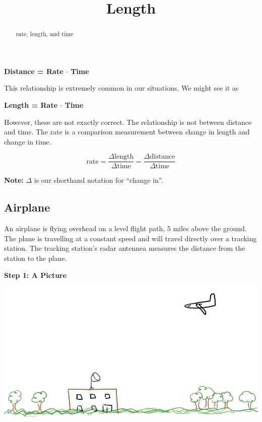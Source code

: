 \documentclass{ximera}
\title{Length}
\begin{document}
\begin{abstract}
rate, length, and time
\end{abstract}
\maketitle




\begin{center}
\textbf{\textcolor{purple!85!blue}{Distance = Rate $\cdot$ Time}} 
\end{center}

This relationship is extremely common in our situations.  We might see it as



\begin{center}
\textbf{\textcolor{purple!85!blue}{Length = Rate $\cdot$ Time}} 
\end{center}



However, these are not exactly correct.  The relationship is not between distance and time.  The rate is a comparison measurement between \textcolor{red!80!black}{change in length} and \textcolor{red!80!black}{change in time}.



\[
\text{rate} = \frac{\Delta \text{length}}{\Delta \text{time}} = \frac{\Delta \text{distance}}{\Delta \text{time}}
\]

\textbf{Note:} $\Delta$ is our shorthand notation for ``change in''. \\






\subsection{Airplane}

An airplane is flying overhead on a level flight path, 5 miles above the ground.  The plane is travelling at a constant speed and will travel directly over a tracking station. The tracking station's radar antennea measures the distance from the station to the plane.






\textbf{\textcolor{purple!85!blue}{Step 1: A Picture}}


\begin{image}
\includegraphics{pics/plane_1.png}
\end{image}
\end{document}
